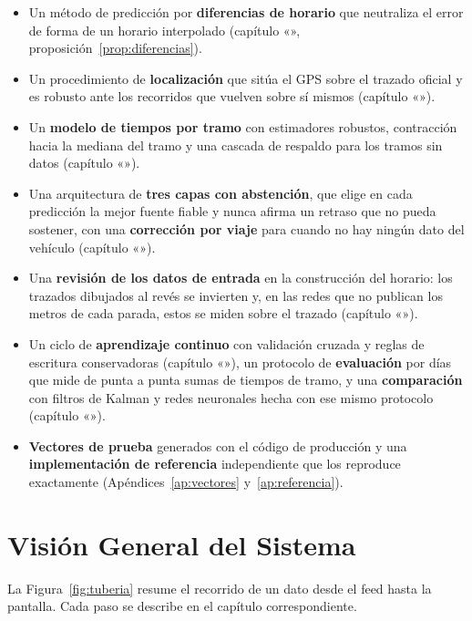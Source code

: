 \begin{itemize}
  \item Un método de predicción por \textbf{diferencias de horario} que neutraliza el error de forma de un horario
        interpolado (capítulo «», proposición~\ref{prop:diferencias}).
  \item Un procedimiento de \textbf{localización} que sitúa el GPS sobre el trazado oficial y es robusto ante los
        recorridos que vuelven sobre sí mismos (capítulo «»).
  \item Un \textbf{modelo de tiempos por tramo} con estimadores robustos, contracción hacia la mediana del tramo y una
        cascada de respaldo para los tramos sin datos (capítulo «»).
  \item Una arquitectura de \textbf{tres capas con abstención}, que elige en cada predicción la mejor fuente fiable y
        nunca afirma un retraso que no pueda sostener, con una \textbf{corrección por viaje} para cuando no hay ningún
        dato del vehículo (capítulo «»).
  \item Una \textbf{revisión de los datos de entrada} en la construcción del horario: los trazados dibujados al revés se
        invierten y, en las redes que no publican los metros de cada parada, estos se miden sobre el trazado
        (capítulo «»).
  \item Un ciclo de \textbf{aprendizaje continuo} con validación cruzada y reglas de escritura conservadoras
        (capítulo «»), un protocolo de \textbf{evaluación} por días que mide de punta a punta sumas de tiempos de
        tramo, y una \textbf{comparación} con filtros de Kalman y redes neuronales hecha con ese mismo protocolo
        (capítulo «»).
  \item \textbf{Vectores de prueba} generados con el código de producción y una \textbf{implementación de referencia}
        independiente que los reproduce exactamente (Apéndices~\ref{ap:vectores} y~\ref{ap:referencia}).
\end{itemize}

\section{Visión General del Sistema}

La Figura~\ref{fig:tuberia} resume el recorrido de un dato desde el feed hasta la pantalla. Cada paso se describe en
el capítulo correspondiente.

